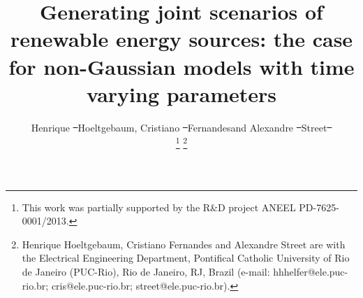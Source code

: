 \documentclass[a4paper]{IEEEtran}
\providecommand{\DIFadd}[1]{{\protect\color{blue}\uwave{#1}}} %
\providecommand{\DIFdel}[1]{{\protect\color{red}\sout{#1}}}                      %
\providecommand{\DIFaddbegin}{} %
\providecommand{\DIFaddend}{} %
\providecommand{\DIFdelbegin}{} %
\providecommand{\DIFdelend}{} %
\begin{document}
\title{Generating joint scenarios of renewable energy sources: the case for non-Gaussian models with time varying parameters}

\author{Henrique \DIFdelbegin \DIFdel{~}\DIFdelend Hoeltgebaum,
	Cristiano \DIFdelbegin \DIFdel{~}\DIFdelend Fernandes\DIFaddbegin \DIFadd{, }\DIFaddend and
	Alexandre \DIFdelbegin \DIFdel{~}\DIFdelend Street\DIFdelbegin \DIFdel{~}%
\DIFdelend \DIFaddbegin \DIFadd{, }
	\DIFaddend 

	
	\thanks{This work was partially supported by the R\&D project ANEEL PD-7625-0001/2013.}
	\thanks{Henrique Hoeltgebaum, Cristiano Fernandes and Alexandre Street are with the Electrical Engineering Department, Pontifical Catholic University of Rio de Janeiro (PUC-Rio), Rio de Janeiro, RJ, Brazil (e-mail: \mbox{hhhelfer@ele.puc-rio.br}; \mbox{cris@ele.puc-rio.br}; \mbox{street@ele.puc-rio.br}).}
}
\end{document}
